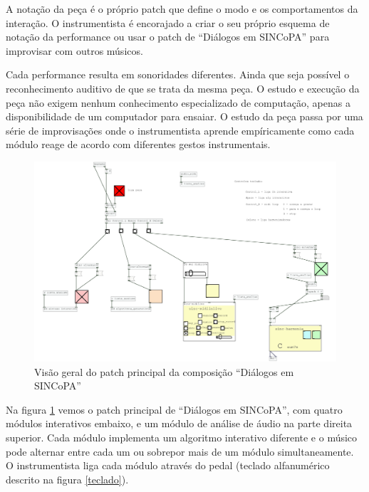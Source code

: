 \documentclass{ppgmus}
\begin{document}
A notação da peça é o próprio patch que define o modo e os comportamentos
da interação. O instrumentista é encorajado a criar o seu próprio esquema
de notação da performance ou usar o patch de ``Diálogos em SINCoPA'' para
improvisar com outros músicos.

Cada performance resulta em sonoridades diferentes. Ainda que seja possível o
reconhecimento auditivo de que se trata da mesma peça. O estudo e execução da peça
não exigem nenhum conhecimento especializado de computação, apenas a disponibilidade de um 
computador para ensaiar. O estudo da peça passa por uma série de improvisações onde
o instrumentista aprende empíricamente como cada módulo reage de acordo com
diferentes gestos instrumentais.

\begin{figure}
\includegraphics[scale=.4]{comp}
\caption{Visão geral do patch principal da composição ``Diálogos em SINCoPA''}
\label{comp}
\end{figure}

Na figura \ref{comp} vemos o patch principal de ``Diálogos em SINCoPA'', com quatro
módulos interativos embaixo, e um módulo de análise de áudio na parte direita superior.
Cada módulo implementa um algoritmo interativo diferente e o músico pode alternar 
entre cada um ou sobrepor mais de um módulo simultaneamente. O instrumentista
liga cada módulo através do pedal (teclado alfanumérico descrito na figura \ref{teclado}).
\end{document}
